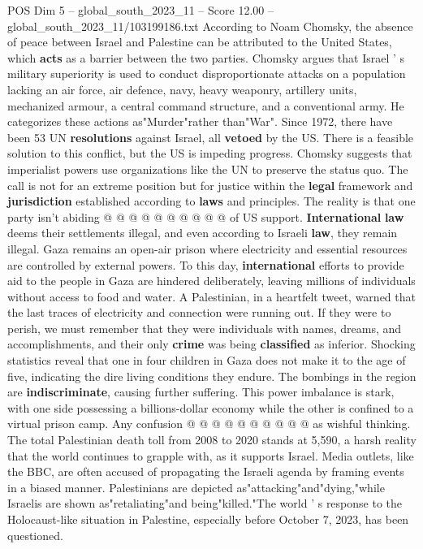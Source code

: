 \begin{textsample}{POS Dim 5 – global\_south\_2023\_11 – Score 12.00 – global\_south\_2023\_11/103199186.txt}
According to Noam Chomsky, the absence of peace between Israel and Palestine can be attributed to the United States, which \textbf{acts} as a barrier between the two parties.
Chomsky argues that Israel ' s military superiority is used to conduct disproportionate attacks on a population lacking an air force, air defence, navy, heavy weaponry, artillery units, mechanized armour, a central command structure, and a conventional army.
He categorizes these actions as"Murder"rather than"War".
Since 1972, there have been 53 UN \textbf{resolutions} against Israel, all \textbf{vetoed} by the US.
There is a feasible solution to this conflict, but the US is impeding progress.
Chomsky suggests that imperialist powers use organizations like the UN to preserve the status quo.
The call is not for an extreme position but for justice within the \textbf{legal} framework and \textbf{jurisdiction} established according to \textbf{laws} and principles.
The reality is that one party isn't abiding @ @ @ @ @ @ @ @ @ @ of US support. \textbf{International} \textbf{law} deems their settlements illegal, and even according to Israeli \textbf{law}, they remain illegal.
Gaza remains an open-air prison where electricity and essential resources are controlled by external powers.
To this day, \textbf{international} efforts to provide aid to the people in Gaza are hindered deliberately, leaving millions of individuals without access to food and water.
A Palestinian, in a heartfelt tweet, warned that the last traces of electricity and connection were running out.
If they were to perish, we must remember that they were individuals with names, dreams, and accomplishments, and their only \textbf{crime} was being \textbf{classified} as inferior.
Shocking statistics reveal that one in four children in Gaza does not make it to the age of five, indicating the dire living conditions they endure.
The bombings in the region are \textbf{indiscriminate}, causing further suffering.
This power imbalance is stark, with one side possessing a billions-dollar economy while the other is confined to a virtual prison camp.
Any confusion @ @ @ @ @ @ @ @ @ @ as wishful thinking.
The total Palestinian death toll from 2008 to 2020 stands at 5,590, a harsh reality that the world continues to grapple with, as it supports Israel.
Media outlets, like the BBC, are often accused of propagating the Israeli agenda by framing events in a biased manner.
Palestinians are depicted as"attacking"and"dying,"while Israelis are shown as"retaliating"and being"killed."The world ' s response to the Holocaust-like situation in Palestine, especially before October 7, 2023, has been questioned.

\end{textsample}
